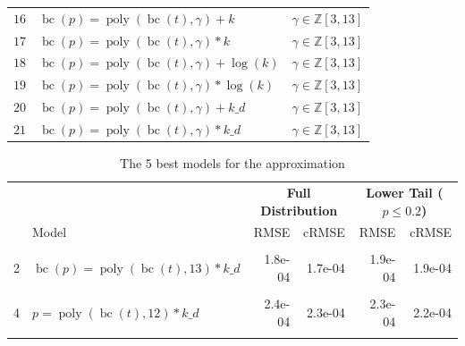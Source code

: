 \documentclass[12pt,a4paper]{article}
\DeclareMathOperator{\bc}{bc}
\DeclareMathOperator{\poly}{poly}
\begin{document}
\begin{table}
\begin{tabular}{rlc}
        $16$ & $\bc(p) = \poly\left( \bc(t), \gamma \right) + k $ & $\gamma \in \mathbb{Z} \left[3, 13 \right]$\\
        $17$ & $\bc(p) = \poly\left( \bc(t), \gamma \right) * k $ & $\gamma \in \mathbb{Z} \left[3, 13 \right]$\\
        $18$ & $\bc(p) = \poly\left( \bc(t), \gamma \right) + \log(k) $ & $\gamma \in \mathbb{Z} \left[3, 13 \right]$\\
        $19$ & $\bc(p) = \poly\left( \bc(t), \gamma \right) * \log(k) $ & $\gamma \in \mathbb{Z} \left[3, 13 \right]$\\
        $20$ & $\bc(p) = \poly\left( \bc(t), \gamma \right) + k\_d $ & $\gamma \in \mathbb{Z} \left[3, 13 \right]$\\
        $21$ & $\bc(p) = \poly\left( \bc(t), \gamma \right) * k\_d $ & $\gamma \in \mathbb{Z} \left[3, 13 \right]$\\    
        \bottomrule
    \end{tabular}
\end{table}

\FloatBarrier
\begin{table}[!h]

\caption{\label{tab:structure and lm}\label{tab:all_1} The 5 best models for the approximation}
\centering
\begin{tabular}[t]{llrrrr}
\toprule
\multicolumn{1}{c}{\textbf{}} & \multicolumn{1}{c}{\textbf{}} & \multicolumn{2}{c}{\textbf{Full Distribution}} & \multicolumn{2}{c}{\textbf{Lower Tail ($p \leq 0.2$)}} \\
\cmidrule(l{3pt}r{3pt}){3-4} \cmidrule(l{3pt}r{3pt}){5-6}
  & Model & RMSE & cRMSE & RMSE & cRMSE\\
\midrule
\cellcolor{gray!6}{1} & \cellcolor{gray!6}{$p = \poly\left( \bc(t), 13 \right) * k\_d$} & \cellcolor{gray!6}{1.8e-04} & \cellcolor{gray!6}{1.7e-04} & \cellcolor{gray!6}{1.7e-04} & \cellcolor{gray!6}{1.7e-04}\\
2 & $\bc(p) = \poly\left( \bc(t), 13 \right) * k\_d$ & 1.8e-04 & 1.7e-04 & 1.9e-04 & 1.9e-04\\
\cellcolor{gray!6}{3} & \cellcolor{gray!6}{$\bc(p) = \poly\left( \bc(t), 12 \right) * k\_d$} & \cellcolor{gray!6}{2.0e-04} & \cellcolor{gray!6}{2.0e-04} & \cellcolor{gray!6}{2.1e-04} & \cellcolor{gray!6}{2.0e-04}\\
4 & $p = \poly\left( \bc(t), 12 \right) * k\_d$ & 2.4e-04 & 2.3e-04 & 2.3e-04 & 2.2e-04\\
\cellcolor{gray!6}{5} & \cellcolor{gray!6}{$\bc(p) = \poly\left( \bc(t), 11 \right) * k\_d$} & \cellcolor{gray!6}{2.2e-04} & \cellcolor{gray!6}{2.1e-04} & \cellcolor{gray!6}{2.3e-04} & \cellcolor{gray!6}{2.2e-04}\\
\bottomrule
\end{tabular}
\end{table}
\end{document}
